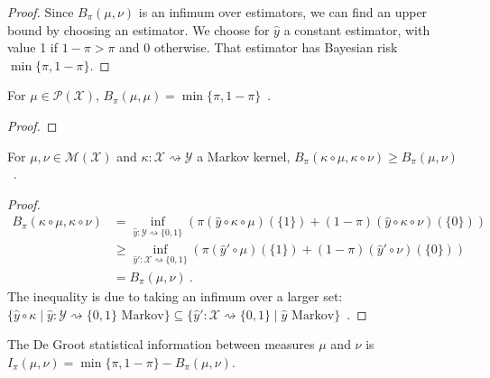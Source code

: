 \begin{proof}%
{}
Since $B_\pi(\mu, \nu)$ is an infimum over estimators, we can find an upper bound by choosing an estimator. We choose for $\hat{y}$ a constant estimator, with value 1 if $1- \pi > \pi$ and 0 otherwise.
That estimator has Bayesian risk $\min\{\pi, 1 - \pi\}$.
\end{proof}

\begin{lemma}
  \label{lem:bayesBinaryRisk_self}
  For $\mu \in \mathcal P(\mathcal X)$, $B_\pi(\mu, \mu) = \min\{\pi, 1-\pi\}$~.
\end{lemma}

\begin{proof}%
\uses{}
\end{proof}

\begin{theorem}
  \label{thm:data_proc_bayesBinaryRisk}
  For $\mu, \nu \in \mathcal M(\mathcal X)$ and $\kappa : \mathcal X \rightsquigarrow \mathcal Y$ a Markov kernel, $B_\pi(\kappa \circ \mu, \kappa \circ \nu) \ge B_\pi(\mu, \nu)$~.
\end{theorem}

\begin{proof}%
\uses{}
\begin{align*}
B_\pi(\kappa \circ \mu, \kappa \circ \nu)
&= \inf_{\hat{y} : \mathcal Y \rightsquigarrow \{0,1\}}\left(\pi (\hat{y} \circ \kappa \circ \mu)(\{1\}) + (1 - \pi) (\hat{y} \circ \kappa \circ \nu)(\{0\})\right)
\\
&\ge \inf_{\hat{y}' : \mathcal X \rightsquigarrow \{0,1\}}\left(\pi (\hat{y}' \circ \mu)(\{1\}) + (1 - \pi) (\hat{y}' \circ \nu)(\{0\})\right)
\\
&= B_\pi(\mu, \nu)
\: .
\end{align*}
The inequality is due to taking an infimum over a larger set: $\{\hat{y} \circ \kappa \mid \hat{y} : \mathcal Y \rightsquigarrow \{0,1\} \text{ Markov}\} \subseteq \{\hat{y}' : \mathcal X \rightsquigarrow \{0,1\} \mid \hat{y} \text{ Markov}\}$~.
\end{proof}

\begin{definition}
  \label{def:deGrootInfo}
  The De Groot statistical information between measures $\mu$ and $\nu$ is $I_\pi(\mu, \nu) = \min\{\pi, 1 - \pi\} - B_\pi(\mu, \nu)$.
\end{definition}

